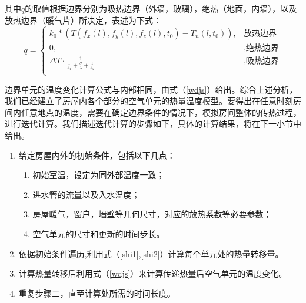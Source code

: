 \documentclass{my_paper}
\renewenvironment{framed}[1][\hsize]
  {\MakeFramed{\hsize#1\advance\hsize-\width \FrameRestore}}%
  {\endMakeFramed}
\begin{document}
其中$q$的取值根据边界分别为吸热边界（外墙，玻璃），绝热（地面，内墙），以及放热边界（暖气片）所决定，表述为下式：
\begin{equation}
    q = \begin{cases}
         k_0 * (T(f_x(l),f_y(l),f_z(l),t_0)-T_n(l,t_0)),& \text{放热边界}\\
         0,& ,\text{绝热边界}\\
        \Delta T \cdot \frac{1}{\frac{1}{h_1}+\frac{\sigma}{\lambda}+\frac{1}{h_2}}&,\text{吸热边界}\\
    \end{cases}
    \label{shi2}
\end{equation}

边界单元的温度变化计算公式与内部相同，由式（\ref{wdjs}）给出。综合上述分析，我们已经建立了房屋内各个部分的空气单元的热量温度模型。要得出在任意时刻房间内任意地点的温度，需要在确定边界条件的情况下，模拟房间整体的传热过程，进行迭代计算。我们描述迭代计算的步骤如下，具体的计算结果，将在下一小节中给出。
{
    \renewcommand\theenumi{\chinese{enumi}}
    \renewcommand\labelenumi{\textbf{步骤\theenumi：}}
    \begin{framed}[0.7\textwidth]
        \centering
        \begin{minipage}[h][0.9\textwidth][c]{24em}
            \begin{enumerate}
                \item 给定房屋内外的初始条件，包括以下几点：
                \begin{enumerate}
                    \item 初始室温，设定为同外部温度一致；
                    \item 进水管的流量以及入水温度；
                    \item 房屋暖气，窗户，墙壁等几何尺寸，对应的放热系数等必要参数；
                    \item 空气单元的尺寸和更新的时间步长。
                \end{enumerate}
                \item 依据初始条件遍历,利用式（\ref{shi1},\ref{shi2}）计算每个单元处的热量转移量。
                \item 计算热量转移后利用式（\ref{wdjs}）来计算传递热量后空气单元的温度变化。
                \item 重复步骤二，直至计算处所需的时间长度。
            \end{enumerate}
        \end{minipage}
\end{framed}
}
\end{document}
